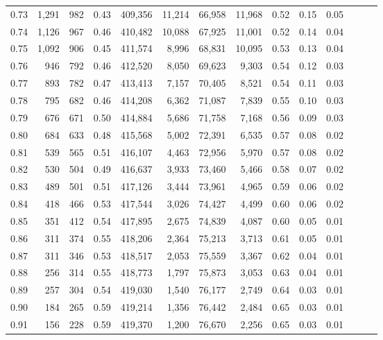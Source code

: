 \begin{tabular}{rrrrrrrrrrrrrr}
0.73 &  1,291 &    982 &  0.43 &  409,356 &   11,214 &  66,958 &  11,968 &  0.52 &  0.15 &      0.05 \\
0.74 &  1,126 &    967 &  0.46 &  410,482 &   10,088 &  67,925 &  11,001 &  0.52 &  0.14 &      0.04 \\
0.75 &  1,092 &    906 &  0.45 &  411,574 &    8,996 &  68,831 &  10,095 &  0.53 &  0.13 &      0.04 \\
0.76 &    946 &    792 &  0.46 &  412,520 &    8,050 &  69,623 &   9,303 &  0.54 &  0.12 &      0.03 \\
0.77 &    893 &    782 &  0.47 &  413,413 &    7,157 &  70,405 &   8,521 &  0.54 &  0.11 &      0.03 \\
0.78 &    795 &    682 &  0.46 &  414,208 &    6,362 &  71,087 &   7,839 &  0.55 &  0.10 &      0.03 \\
0.79 &    676 &    671 &  0.50 &  414,884 &    5,686 &  71,758 &   7,168 &  0.56 &  0.09 &      0.03 \\
0.80 &    684 &    633 &  0.48 &  415,568 &    5,002 &  72,391 &   6,535 &  0.57 &  0.08 &      0.02 \\
0.81 &    539 &    565 &  0.51 &  416,107 &    4,463 &  72,956 &   5,970 &  0.57 &  0.08 &      0.02 \\
0.82 &    530 &    504 &  0.49 &  416,637 &    3,933 &  73,460 &   5,466 &  0.58 &  0.07 &      0.02 \\
0.83 &    489 &    501 &  0.51 &  417,126 &    3,444 &  73,961 &   4,965 &  0.59 &  0.06 &      0.02 \\
0.84 &    418 &    466 &  0.53 &  417,544 &    3,026 &  74,427 &   4,499 &  0.60 &  0.06 &      0.02 \\
0.85 &    351 &    412 &  0.54 &  417,895 &    2,675 &  74,839 &   4,087 &  0.60 &  0.05 &      0.01 \\
0.86 &    311 &    374 &  0.55 &  418,206 &    2,364 &  75,213 &   3,713 &  0.61 &  0.05 &      0.01 \\
0.87 &    311 &    346 &  0.53 &  418,517 &    2,053 &  75,559 &   3,367 &  0.62 &  0.04 &      0.01 \\
0.88 &    256 &    314 &  0.55 &  418,773 &    1,797 &  75,873 &   3,053 &  0.63 &  0.04 &      0.01 \\
0.89 &    257 &    304 &  0.54 &  419,030 &    1,540 &  76,177 &   2,749 &  0.64 &  0.03 &      0.01 \\
0.90 &    184 &    265 &  0.59 &  419,214 &    1,356 &  76,442 &   2,484 &  0.65 &  0.03 &      0.01 \\
0.91 &    156 &    228 &  0.59 &  419,370 &    1,200 &  76,670 &   2,256 &  0.65 &  0.03 &      0.01 \\

\end{tabular}

